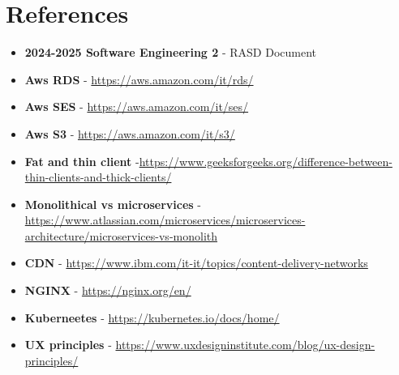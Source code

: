 \section{References}
\begin{itemize}
    \item \textbf{2024-2025 Software Engineering 2} - RASD Document
    \item \textbf{Aws RDS} - \href{https://aws.amazon.com/it/rds/}{https://aws.amazon.com/it/rds/}
    \item \textbf{Aws SES} - \href{https://aws.amazon.com/it/ses/}{https://aws.amazon.com/it/ses/}
    \item \textbf{Aws S3} - \href{https://aws.amazon.com/it/s3/}{https://aws.amazon.com/it/s3/}
    \item \textbf{Fat and thin client} -\href{https://www.geeksforgeeks.org/difference-between-thin-clients-and-thick-clients/} {https://www.geeksforgeeks.org/difference-between-thin-clients-and-thick-clients/}
    \item \textbf{Monolithical vs microservices} - \href{https://www.atlassian.com/microservices/microservices-architecture/microservices-vs-monolith}{https://www.atlassian.com/microservices/microservices-architecture/microservices-vs-monolith}
    \item \textbf{CDN} - \href{https://www.ibm.com/it-it/topics/content-delivery-networks}{https://www.ibm.com/it-it/topics/content-delivery-networks}
    \item \textbf{NGINX} - \href{https://nginx.org/en/}
    {https://nginx.org/en/}
    \item \textbf{Kuberneetes} - \href{https://kubernetes.io/docs/home/}{https://kubernetes.io/docs/home/}
    \item \textbf{UX principles} -  \href{https://www.uxdesigninstitute.com/blog/ux-design-principles/}{https://www.uxdesigninstitute.com/blog/ux-design-principles/}

\end{itemize}


